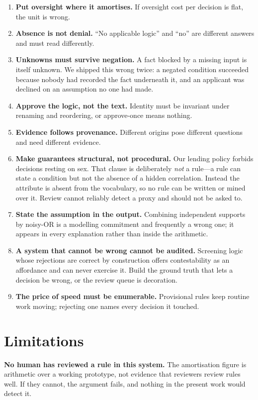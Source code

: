 \documentclass[sigconf,nonacm]{acmart}
\begin{document}
\begin{enumerate}
\item \textbf{Put oversight where it amortises.} If oversight cost per decision
  is flat, the unit is wrong.
\item \textbf{Absence is not denial.} ``No applicable logic'' and ``no'' are
  different answers and must read differently.
\item \textbf{Unknowns must survive negation.} A fact blocked by a
  missing input is itself unknown. We shipped this wrong twice: a negated
  condition succeeded because nobody had recorded the fact underneath it, and an
  applicant was declined on an assumption no one had made.
\item \textbf{Approve the logic, not the text.} Identity must be invariant under
  renaming and reordering, or approve-once means nothing.
\item \textbf{Evidence follows provenance.} Different origins pose different
  questions and need different evidence.
\item \textbf{Make guarantees structural, not procedural.} Our lending policy
  forbids decisions resting on sex. That clause is deliberately \emph{not} a
  rule---a rule can state a condition but not the absence of a hidden
  correlation. Instead the attribute is absent from the vocabulary, so no rule
  can be written or mined over it. Review cannot reliably detect a proxy and
  should not be asked to.
\item \textbf{State the assumption in the output.} Combining independent
  supports by noisy-OR is a modelling commitment and frequently a wrong one; it
  appears in every explanation rather than inside the arithmetic.
\item \textbf{A system that cannot be wrong cannot be audited.} Screening
  logic whose rejections are correct by construction offers contestability as an
  affordance and can never exercise it. Build the ground truth that lets a
  decision be wrong, or the review queue is decoration.
\item \textbf{The price of speed must be enumerable.} Provisional rules keep
  routine work moving; rejecting one names every decision it touched.
\end{enumerate}

\section{Limitations}
\label{sec:limits}

\textbf{No human has reviewed a rule in this system.} The amortisation figure is
arithmetic over a working prototype, not evidence that reviewers review rules
well. If they cannot, the argument fails, and nothing in the present work would
detect it.
\end{document}
